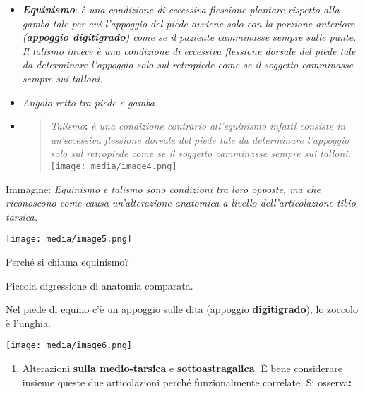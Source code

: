 \documentclass[]{article}
\begin{document}
\begin{itemize}
\item
  \textbf{\emph{Equinismo}}: \emph{è una condizione di eccessiva
  flessione plantare rispetto alla gamba tale per cui l'appoggio del
  piede avviene solo con la porzione anteriore (\textbf{appoggio
  digitigrado}) come se il paziente camminasse sempre sulle punte. Il
  \emph{talismo} invece è una condizione di eccessiva flessione dorsale
  del piede tale da determinare l'appoggio solo sul retropiede come se
  il soggetto camminasse sempre sui talloni. }
\item
  \emph{Angolo retto tra piede e gamba}
\item
  \begin{quote}
  \emph{Talismo}\textbf{:} \emph{è una condizione contrario
  all'equinismo infatti consiste in un'eccessiva flessione dorsale del
  piede tale da determinare l'appoggio solo sul retropiede come se il
  soggetto camminasse sempre sui talloni.}
  \texttt{[image: media/image4.png]}
  \end{quote}
\end{itemize}

Immagine: \emph{Equinismo e talismo sono condizioni tra loro opposte, ma
che riconoscono come causa un'alterazione anatomica a livello
dell'\emph{articolazione tibio-tarsica}.}

\texttt{[image: media/image5.png]}

Perché si chiama equinismo?

Piccola digressione di anatomia comparata.

Nel piede di equino c'è un appoggio sulle dita (appoggio
\textbf{digitigrado}), lo zoccolo è l'unghia.

\texttt{[image: media/image6.png]}

\begin{enumerate}
\def\labelenumi{\arabic{enumi}.}
\item
  Alterazioni \textbf{sulla medio-tarsica} e \textbf{sottoastragalica}.
  È bene considerare insieme queste due articolazioni perché
  funzionalmente correlate. Si osserva\textbf{:}
\end{enumerate}
\end{document}
